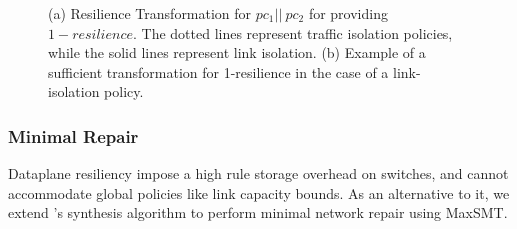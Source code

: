 \begin{figure}
	\centering
	\caption{\label{fig:restransform}
		(a) Resilience Transformation for $pc_1 || \ pc_2$ for providing $1-resilience$. 
		The dotted lines represent traffic isolation policies, 
		while the solid lines represent link isolation. (b) Example of a sufficient transformation
		for 1-resilience in the case of a link-isolation policy.}
\end{figure}


\subsubsection{Minimal Repair} \label{sec:repair}

Dataplane resiliency impose a high rule storage overhead on switches,
and cannot accommodate global policies like link capacity bounds. 
As an alternative to it, we
extend \name's synthesis algorithm to perform minimal network
repair using MaxSMT.

